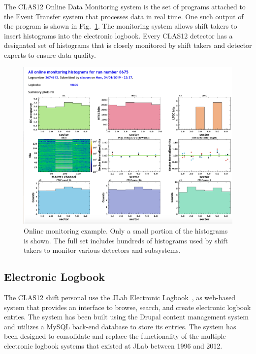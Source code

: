The CLAS12 Online Data Monitoring system is the set of programs attached to the Event Transfer system that processes
data in real time. One such output of the program is shown in Fig.~\ref{fig:online_monitor}. The monitoring system allows
shift takers to insert histograms into the electronic logbook. Every CLAS12 detector has a designated set of histograms
that is closely monitored by shift takers and detector experts to ensure data quality.

\begin{figure}[hbt]
	\centering
	\includegraphics[width=1.0\columnwidth,keepaspectratio]{img/online_monitor.png}
	\caption{Online monitoring example. Only a small portion of the histograms is shown. The full set includes hundreds
          of histograms used by shift takers to monitor various detectors and subsystems.}
	\label{fig:online_monitor}
\end{figure}

\subsection{Electronic Logbook}

The CLAS12 shift personal use the JLab Electronic Logbook~\cite{logbook-ref}, as web-based system that provides
an interface to browse, search, and create electronic logbook entries. The system has been built using the Drupal content
management system and utilizes a MySQL back-end database to store its entries. The system has been designed to
consolidate and replace the functionality of the multiple electronic logbook systems that existed at JLab between 1996
and 2012.


